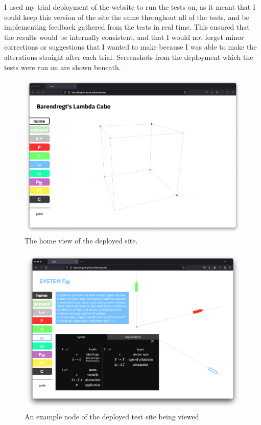 \documentclass{l4proj}
\begin{document}
I used my trial deployment of the website to run the tests on, as it meant that I could keep this version of the site the same throughout all of the tests, and be implementing feedback gathered from the tests in real time.  This ensured that the results would be internally consistent, and that I would not forget minor corrections or suggestions that I wanted to make because I was able to make the alterations straight after each trial.  Screenshots from the deployment which the tests were run on are shown beneath.

\begin{figure}[h!]
    \centering
    \includegraphics[width=0.8\linewidth]{dissertation/images/trial_deployment_home.png}
    \caption{The home view of the deployed site.}
    \label{fig:enter-label}
\end{figure}

\begin{figure}[h!]
    \centering
    \includegraphics[width=0.8\linewidth]{dissertation/images/trial_deployment_zoomed.png}
    \caption{An example node of the deployed test site being viewed}
    \label{fig:enter-label}
\end{figure}
\end{document}
